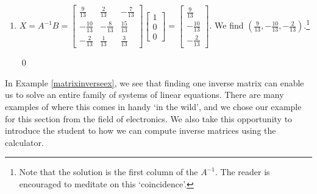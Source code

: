\documentclass{ximera}
\begin{document}
\begin{example}
\begin{enumerate}
\begin{enumerate}
\item $X = A^{-1}B = \left[ \begin{array}{rrr} \frac{9}{13} & \frac{2}{13} & -\frac{7}{13} \\  -\frac{10}{13} & -\frac{8}{13} & \frac{15}{13} \\  -\frac{2}{13} & \frac{1}{13} & \frac{3}{13}  \end{array} \right] \left[ \begin{array}{r} 1 \\  0 \\  0 \end{array}\right] =  \left[ \begin{array}{r} \frac{9}{13} \\  -\frac{10}{13} \\  -\frac{2}{13} \end{array}\right]$. We find $\left( \frac{9}{13},  -\frac{10}{13},    -\frac{2}{13}   \right)$.\footnote{Note that the solution is the first column of the $A^{-1}$.  The reader is encouraged to meditate on this `coincidence'.}

\qed

\end{enumerate}

\end{enumerate}

\end{example}

In Example \ref{matrixinverseex}, we see that finding one inverse matrix can enable us to solve an entire family of systems of linear equations.  There are many examples of where this comes in handy `in the wild', and we chose our example for this section from the field of electronics.  We also take this opportunity to introduce the student to how we can compute inverse matrices using the calculator.
\end{document}

